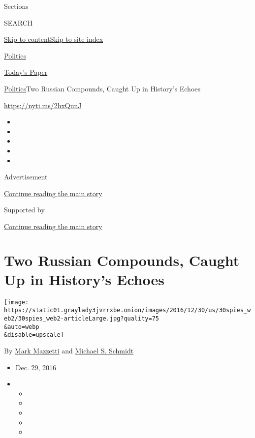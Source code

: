 Sections

SEARCH

\protect\hyperlink{site-content}{Skip to
content}\protect\hyperlink{site-index}{Skip to site index}

\href{https://www.nytimes3xbfgragh.onion/section/politics}{Politics}

\href{https://myaccount.nytimes3xbfgragh.onion/auth/login?response_type=cookie\&client_id=vi}{}

\href{https://www.nytimes3xbfgragh.onion/section/todayspaper}{Today's
Paper}

\href{/section/politics}{Politics}\textbar{}Two Russian Compounds,
Caught Up in History's Echoes

\url{https://nyti.ms/2hxQunJ}

\begin{itemize}
\item
\item
\item
\item
\item
\end{itemize}

Advertisement

\protect\hyperlink{after-top}{Continue reading the main story}

Supported by

\protect\hyperlink{after-sponsor}{Continue reading the main story}

\hypertarget{two-russian-compounds-caught-up-in-historys-echoes}{%
\section{Two Russian Compounds, Caught Up in History's
Echoes}\label{two-russian-compounds-caught-up-in-historys-echoes}}

\texttt{[image: https://static01.graylady3jvrrxbe.onion/images/2016/12/30/us/30spies\_web2/30spies\_web2-articleLarge.jpg?quality=75\\\&auto=webp\\\&disable=upscale]}

By \href{http://www.nytimes3xbfgragh.onion/by/mark-mazzetti}{Mark
Mazzetti} and
\href{http://www.nytimes3xbfgragh.onion/by/michael-s-schmidt}{Michael S.
Schmidt}

\begin{itemize}
\item
  Dec. 29, 2016
\item
  \begin{itemize}
  \item
  \item
  \item
  \item
  \item
  \end{itemize}
\end{itemize}

